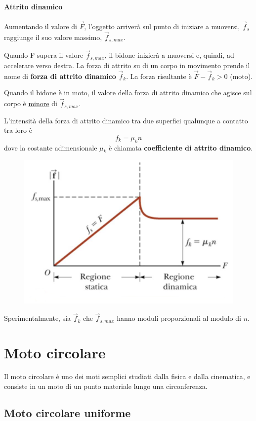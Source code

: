 \documentclass[12pt,oneside]{book}
\begin{document}
\paragraph{Attrito dinamico}
Aumentando il valore di $\vec{F}$, l'oggetto arriverà sul punto di iniziare a muoversi, $\vec{f}_s$ raggiunge il suo valore massimo, $\vec{f}_{s,max}$.

Quando F supera il valore $\vec{f}_{s,max}$, il bidone inizierà a muoversi e, quindi, ad accelerare verso destra. La forza di attrito su di un corpo in movimento prende il nome di \textbf{forza di attrito dinamico} $\vec{f}_k$.
La forza risultante è $\vec{F} - \vec{f}_k > 0$ (moto).

Quando il bidone è in moto, il valore della forza di attrito dinamico che agisce sul corpo è \underline{minore} di $\vec{f}_{s,max}$. 

L’intensità della forza di attrito dinamico tra due superfici qualunque a contatto tra loro è
\begin{equation*}
    f_k = \mu_k n
\end{equation*}
dove la costante adimensionale $\mu_k$ è chiamata \textbf{coefficiente di attrito dinamico}.

\begin{figure}[h]
    \centering
    \includegraphics[scale=0.3]{forze_attrito_grafico}
\end{figure}
\noindent Sperimentalmente, sia $\vec{f}_k$ che $\vec{f}_{s,max}$ hanno moduli proporzionali al modulo di $n$.

\newpage
\section{Moto circolare}
Il moto circolare è uno dei moti semplici studiati dalla fisica e dalla cinematica, e consiste in un moto di un punto materiale lungo una circonferenza.

\subsection{Moto circolare uniforme}
\end{document}
